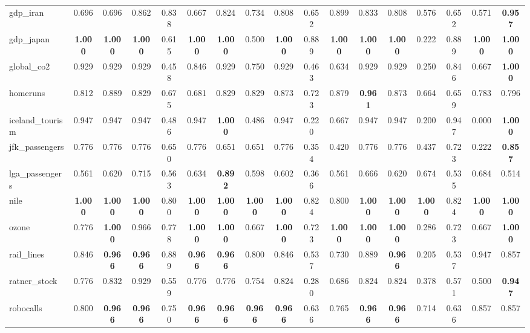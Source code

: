 \documentclass[11pt,a4paper]{article}
\begin{document}
\begin{table}
{\begin{tabular}{lcccccccccccccccc}
gdp\_iran & 0.696 & 0.696 & 0.862 & 0.838 & 0.667 & 0.824 & 0.734 & 0.808 & 0.652 & 0.899 & 0.833 & 0.808 & 0.576 & 0.652 & 0.571 & \textbf{0.957} \\
gdp\_japan & \textbf{1.000} & \textbf{1.000} & \textbf{1.000} & 0.615 & \textbf{1.000} & \textbf{1.000} & 0.500 & \textbf{1.000} & 0.889 & \textbf{1.000} & \textbf{1.000} & \textbf{1.000} & 0.222 & 0.889 & \textbf{1.000} & \textbf{1.000} \\
global\_co2 & 0.929 & 0.929 & 0.929 & 0.458 & 0.846 & 0.929 & 0.750 & 0.929 & 0.463 & 0.634 & 0.929 & 0.929 & 0.250 & 0.846 & 0.667 & \textbf{1.000} \\
homeruns & 0.812 & 0.889 & 0.829 & 0.675 & 0.681 & 0.829 & 0.829 & 0.873 & 0.723 & 0.879 & \textbf{0.961} & 0.873 & 0.664 & 0.659 & 0.783 & 0.796 \\
iceland\_tourism & 0.947 & 0.947 & 0.947 & 0.486 & 0.947 & \textbf{1.000} & 0.486 & 0.947 & 0.220 & 0.667 & 0.947 & 0.947 & 0.200 & 0.947 & 0.000 & \textbf{1.000} \\
jfk\_passengers & 0.776 & 0.776 & 0.776 & 0.650 & 0.776 & 0.651 & 0.651 & 0.776 & 0.354 & 0.420 & 0.776 & 0.776 & 0.437 & 0.723 & 0.222 & \textbf{0.857} \\
lga\_passengers & 0.561 & 0.620 & 0.715 & 0.563 & 0.634 & \textbf{0.892} & 0.598 & 0.602 & 0.366 & 0.561 & 0.666 & 0.620 & 0.674 & 0.535 & 0.684 & 0.514 \\
nile & \textbf{1.000} & \textbf{1.000} & \textbf{1.000} & 0.800 & \textbf{1.000} & \textbf{1.000} & \textbf{1.000} & \textbf{1.000} & 0.824 & 0.800 & \textbf{1.000} & \textbf{1.000} & \textbf{1.000} & 0.824 & \textbf{1.000} & \textbf{1.000} \\
ozone & 0.776 & \textbf{1.000} & 0.966 & 0.778 & \textbf{1.000} & \textbf{1.000} & 0.667 & \textbf{1.000} & 0.723 & \textbf{1.000} & \textbf{1.000} & \textbf{1.000} & 0.286 & 0.723 & 0.667 & \textbf{1.000} \\
rail\_lines & 0.846 & \textbf{0.966} & \textbf{0.966} & 0.889 & \textbf{0.966} & \textbf{0.966} & 0.800 & 0.846 & 0.537 & 0.730 & 0.889 & \textbf{0.966} & 0.205 & 0.537 & 0.947 & 0.857 \\
ratner\_stock & 0.776 & 0.832 & 0.929 & 0.559 & 0.776 & 0.776 & 0.754 & 0.824 & 0.280 & 0.686 & 0.824 & 0.824 & 0.378 & 0.571 & 0.500 & \textbf{0.947} \\
robocalls & 0.800 & \textbf{0.966} & \textbf{0.966} & 0.750 & \textbf{0.966} & \textbf{0.966} & \textbf{0.966} & \textbf{0.966} & 0.636 & 0.765 & \textbf{0.966} & \textbf{0.966} & 0.714 & 0.636 & 0.857 & 0.857 \\

\end{tabular}}
\end{table}
\end{document}
